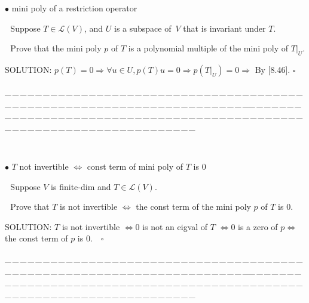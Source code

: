 \documentclass[a4paper, 11pt, UTF8]{article}
\def\Lm{\mathcal{L}}
\begin{document}
\begin{large}
{\small $\bullet$} {\timessl\normalsize mini poly of a restriction operator}\par\,\,
{\timessl\Large Suppose $T\in\Lm(V)$, and $U$ is a subspace of \,$V$ that is invariant under $T$.}\par\,\,
{\timessl\Large Prove that the mini poly $p$ of $T$ is a polynomial multiple of the mini poly of $T|_U$.}\par
{\timesbf S\footnotesize{OLUTION:}}
$p(T)=0\Rightarrow\forall u\in U,p(T)u=0\Rightarrow p(T|_U)=0\Rightarrow$ By [8.46]. $\square$\par
{\tiny \_\,\_\,\_\,\_\,\_\,\_\,\_\,\_\,\_\,\_\,\_\,\_\,\_\,\_\,\_\,\_\,\_\,\_\,\_\,\_\,\_\,\_\,\_\,\_\,\_\,\_\,\_\,\_\,\_\,\_\,\_\,\_\,\_\,\_\,\_\,\_\,\_\,\_\,\_\,\_\,\_\,\_\,\_\,\_\,\_\,\_\,\_\,\_\,\_\,\_\,\_\,\_\,\_\,\_\,\_\,\_\,\_\,\_\,\_\,\_\,\_\,\_\,\_\,\_\,\_\,\_\,\_\,\_\,\_\,\_\,\_\_\,\_\,\_\,\_\,\_\,\_\,\_\,\_\,\_\,\_\,\_\,\_\,\_\,\_\,\_\,\_\,\_\,\_\,\_\,\_\,\_\,\_\,\_\,\_\,\_\,\_\,\_\,\_\,\_\,\_\,\_\,\_\,\_\,\_\,\_\,\_\,\_\,\_\,\_\,\_\,\_\,\_\,\_\,\_\,\_\,\_\,\_\,\_\,\_\,\_\,\_\,\_\,\_\,\_\,\_\,\_\,\_\,\_\,\_\,\_\,\_\,\_\,\_\,\_\,\_\,\_\,\_\,\_\,\_\,\_\,\_}{\footnotesize\,\par}

{\small $\bullet$} {\timessl\normalsize $T$ not invertible $\Longleftrightarrow$ const term of mini poly of $T$ is $0$}\par\,\,
{\timessl\Large Suppose $V$ is finite-dim and $T\in\Lm(V)$.}\par\,\,
{\timessl\Large Prove that $T$ is not invertible $\Longleftrightarrow$ the const term of the mini poly $p$ of $T$ is $0$.}\par
{\timesbf S\footnotesize{OLUTION:}}
$T$ is not invertible $\Longleftrightarrow 0$ is not an eigval of $T$ $\Longleftrightarrow 0$ is a zero of $p \Longleftrightarrow$ the const term of $p$ is $0.\quad\square$\par
{\tiny \_\,\_\,\_\,\_\,\_\,\_\,\_\,\_\,\_\,\_\,\_\,\_\,\_\,\_\,\_\,\_\,\_\,\_\,\_\,\_\,\_\,\_\,\_\,\_\,\_\,\_\,\_\,\_\,\_\,\_\,\_\,\_\,\_\,\_\,\_\,\_\,\_\,\_\,\_\,\_\,\_\,\_\,\_\,\_\,\_\,\_\,\_\,\_\,\_\,\_\,\_\,\_\,\_\,\_\,\_\,\_\,\_\,\_\,\_\,\_\,\_\,\_\,\_\,\_\,\_\,\_\,\_\,\_\,\_\,\_\,\_\_\,\_\,\_\,\_\,\_\,\_\,\_\,\_\,\_\,\_\,\_\,\_\,\_\,\_\,\_\,\_\,\_\,\_\,\_\,\_\,\_\,\_\,\_\,\_\,\_\,\_\,\_\,\_\,\_\,\_\,\_\,\_\,\_\,\_\,\_\,\_\,\_\,\_\,\_\,\_\,\_\,\_\,\_\,\_\,\_\,\_\,\_\,\_\,\_\,\_\,\_\,\_\,\_\,\_\,\_\,\_\,\_\,\_\,\_\,\_\,\_\,\_\,\_\,\_\,\_\,\_\,\_\,\_\,\_\,\_\,\_}{\tiny\,\par}


\end{large}
\end{document}
